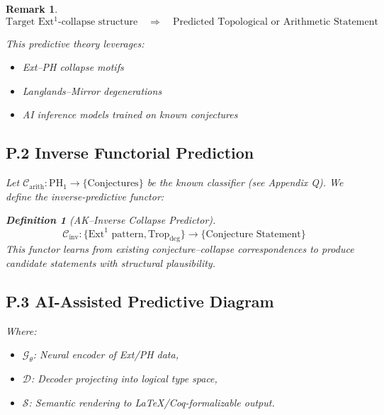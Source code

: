 \documentclass[11pt]{article}
\newtheorem{definition}[theorem]{Definition}
\newtheorem{remark}[theorem]{Remark}
\begin{document}
\begin{remark}
\[
\boxed{
\text{Target Ext$^1$-collapse structure}
\quad \Rightarrow \quad
\text{Predicted Topological or Arithmetic Statement}
}
\]

This predictive theory leverages:
\begin{itemize}
  \item Ext–PH collapse motifs
  \item Langlands–Mirror degenerations
  \item AI inference models trained on known conjectures
\end{itemize}

\subsection*{P.2 Inverse Functorial Prediction}

Let \( \mathscr{C}_{\mathrm{arith}}: \mathrm{PH}_1 \to \{ \text{Conjectures} \} \) be the known classifier (see Appendix Q).  
We define the inverse-predictive functor:

\begin{definition}[AK–Inverse Collapse Predictor]
\[
\mathscr{C}_{\mathrm{inv}}: \{ \mathrm{Ext}^1 \text{ pattern}, \mathrm{Trop}_{\mathrm{deg}} \} \to \{ \text{Conjecture Statement} \}
\]
This functor learns from existing conjecture–collapse correspondences to produce candidate statements with structural plausibility.
\end{definition}

\subsection*{P.3 AI-Assisted Predictive Diagram}

\vspace{1em}
\begin{center}
\end{center}
\vspace{1em}

Where:
\begin{itemize}
  \item \( \mathcal{G}_\theta \): Neural encoder of Ext/PH data,
  \item \( \mathcal{D} \): Decoder projecting into logical type space,
  \item \( \mathcal{S} \): Semantic rendering to LaTeX/Coq-formalizable output.
\end{itemize}


\end{remark}
\end{document}
